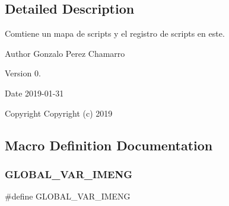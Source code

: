 \subsection{Detailed Description}
Comtiene un mapa de scripts y el registro de scripts en este. 

\begin{DoxyAuthor}{Author}
Gonzalo Perez Chamarro 
\end{DoxyAuthor}
\begin{DoxyVersion}{Version}
0. 
\end{DoxyVersion}
\begin{DoxyDate}{Date}
2019-\/01-\/31
\end{DoxyDate}
\begin{DoxyCopyright}{Copyright}
Copyright (c) 2019 
\end{DoxyCopyright}


\subsection{Macro Definition Documentation}
\mbox{\label{script__registry_8hpp_a4ad4f52a0fd48c54264eff362b2e5f13}} 
\subsubsection{GLOBAL\_VAR\_IMENG}
{\footnotesize\ttfamily \#define G\+L\+O\+B\+A\+L\+\_\+\+V\+A\+R\+\_\+\+I\+M\+E\+NG}

